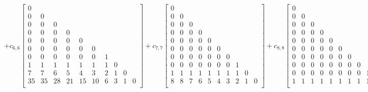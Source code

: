 \begin{sidewaystable}
\begin{equation}
\begin{split}
& + c_{6,6}\left[\begin{array}{cccccccccc}
0 &  &  &  &  &  &  &  &  &  \\
0 & 0 &  &  &  &  &  &  &  &  \\
0 & 0 & 0 &  &  &  &  &  &  &  \\
0 & 0 & 0 & 0 &  &  &  &  &  &  \\
0 & 0 & 0 & 0 & 0 &  &  &  &  &  \\
0 & 0 & 0 & 0 & 0 & 0 &  &  &  &  \\
0 & 0 & 0 & 0 & 0 & 0 & 1 &  &  &  \\
1 & 1 & 1 & 1 & 1 & 1 & 1 & 0 &  &  \\
7 & 7 & 6 & 5 & 4 & 3 & 2 & 1 & 0 &  \\
35 & 35 & 28 & 21 & 15 & 10 & 6 & 3 & 1 & 0 \\
\end{array}\right] + c_{7,7}\left[\begin{array}{cccccccccc}
0 &  &  &  &  &  &  &  &  &  \\
0 & 0 &  &  &  &  &  &  &  &  \\
0 & 0 & 0 &  &  &  &  &  &  &  \\
0 & 0 & 0 & 0 &  &  &  &  &  &  \\
0 & 0 & 0 & 0 & 0 &  &  &  &  &  \\
0 & 0 & 0 & 0 & 0 & 0 &  &  &  &  \\
0 & 0 & 0 & 0 & 0 & 0 & 0 &  &  &  \\
0 & 0 & 0 & 0 & 0 & 0 & 0 & 1 &  &  \\
1 & 1 & 1 & 1 & 1 & 1 & 1 & 1 & 0 &  \\
8 & 8 & 7 & 6 & 5 & 4 & 3 & 2 & 1 & 0 \\
\end{array}\right] + c_{8,8}\left[\begin{array}{cccccccccc}
0 &  &  &  &  &  &  &  &  &  \\
0 & 0 &  &  &  &  &  &  &  &  \\
0 & 0 & 0 &  &  &  &  &  &  &  \\
0 & 0 & 0 & 0 &  &  &  &  &  &  \\
0 & 0 & 0 & 0 & 0 &  &  &  &  &  \\
0 & 0 & 0 & 0 & 0 & 0 &  &  &  &  \\
0 & 0 & 0 & 0 & 0 & 0 & 0 &  &  &  \\
0 & 0 & 0 & 0 & 0 & 0 & 0 & 0 &  &  \\
0 & 0 & 0 & 0 & 0 & 0 & 0 & 0 & 1 &  \\
1 & 1 & 1 & 1 & 1 & 1 & 1 & 1 & 1 & 0 \\

\end{array}
\end{split}
\end{equation}
\end{sidewaystable}
